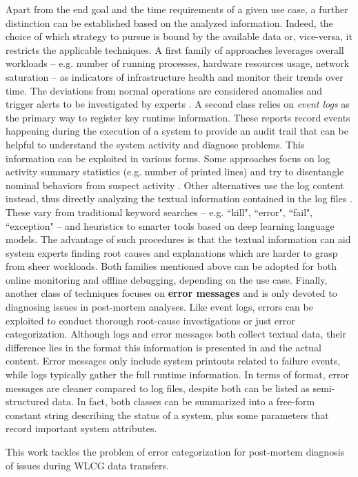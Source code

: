 Apart from the end goal and the time requirements of a given use case, a further distinction can be established based on the analyzed information.
Indeed, the choice of which strategy to pursue is bound by the available data or, vice-versa, it restricts the applicable techniques.
A first family of approaches leverages overall workloads -- e.g. number of running processes, hardware resources usage, network saturation -- as indicators of infrastructure health and monitor their trends over time. The deviations from normal operations are considered anomalies and trigger alerts to be investigated by experts \cite{paltenghi2021}.
A second class relies on \textit{event logs} as the primary way to register key runtime information. These reports record events happening during the execution of a system to provide an audit trail that can be helpful to understand the system activity and diagnose problems.
This information can be exploited in various forms.  
Some approaches focus on log activity summary statistics (e.g. number of printed lines) and try to disentangle nominal behaviors from suspect activity \cite{decker2020fuzzy, decker2020granular, minarini2020time}. 
Other alternatives use the log content instead, thus directly analyzing the textual information contained in the log files \cite{giommi2019predmaintenance}. These vary from traditional keyword searches -- e.g. ``kill", ``error", ``fail", ``exception" -- and heuristics \cite{tisbeni2019} to smarter tools based on deep learning language models.
The advantage of such procedures is that the textual information can aid system experts finding root causes and explanations which are harder to grasp from sheer workloads.
Both families mentioned above can be adopted for both online monitoring and offline debugging, depending on the use case.
Finally, another class of techniques focuses on \textbf{error messages} and is only devoted to diagnosing issues in post-mortem analyses. Like event logs, errors can be exploited to conduct thorough root-cause investigations or just error categorization.
Although logs and error messages both collect textual data, their difference lies in the format this information is presented in and the actual content. 
Error messages only include system printouts related to failure events, while logs typically gather the full runtime information. 
In terms of format, error messages are cleaner compared to log files, despite both can be listed as semi-structured data. 
In fact, both classes can be summarized into a free-form constant string describing the status of a system, plus some parameters that record important system attributes.

This work tackles the problem of error categorization for post-mortem diagnosis of issues during WLCG data transfers.

